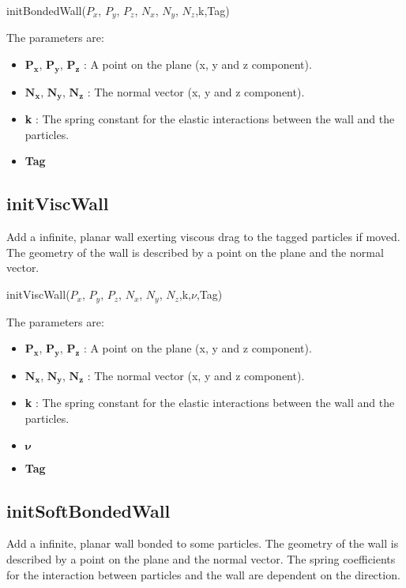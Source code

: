 \documentclass{report}
\begin{document}
\textsf{initBondedWall($P_x$, $P_y$, $P_z$, $N_x$, $N_y$, $N_z$,k,Tag)}
\par\medskip
The parameters are:
\begin{itemize}
\item $\mathbf{P_x}$, $\mathbf{P_y}$, $\mathbf{P_z}$ : A point on the plane (x, y and z component).
\item $\mathbf{N_x}$, $\mathbf{N_y}$, $\mathbf{N_z}$ : The normal vector (x, y and z component).
\item \textbf{k} : The spring constant for the elastic interactions between the wall and the particles.
\item \textbf{Tag}
\end{itemize}

\subsection{initViscWall}
\label{sec::initViscWall}
Add a infinite, planar wall exerting viscous drag to the tagged particles if moved. The geometry of the wall is described by a point on the plane and the normal vector. 

\textsf{initViscWall($P_x$, $P_y$, $P_z$, $N_x$, $N_y$, $N_z$,k,$\nu$,Tag)}
\par\medskip
The parameters are:
\begin{itemize}
\item $\mathbf{P_x}$, $\mathbf{P_y}$, $\mathbf{P_z}$ : A point on the plane (x, y and z component).
\item $\mathbf{N_x}$, $\mathbf{N_y}$, $\mathbf{N_z}$ : The normal vector (x, y and z component).
\item \textbf{k} : The spring constant for the elastic interactions between the wall and the particles.
\item $\mathbf{\nu}$
\item \textbf{Tag}
\end{itemize}

\subsection{initSoftBondedWall}
\label{sec::initSBWall}
Add a infinite, planar wall bonded to some particles. The geometry of the wall is described by a point on the plane and the normal vector. The spring coefficients for the interaction between particles and the wall are dependent on the direction.
\end{document}
